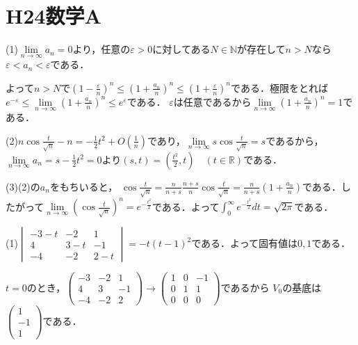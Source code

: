 \documentclass[
		book,
		head_space=20mm,
		foot_space=20mm,
		gutter=10mm,
		line_length=190mm
]{jlreq}
\begin{document}
\section{H24数学A}
(1)$\lim\limits_{n \to \infty} a_n=0$より，任意の$\varepsilon>0$に対してある$N\in \mathbb{N}$が存在して$n>N$なら$\varepsilon<a_n<\varepsilon$である．

よって$n>N$で$(1-\frac{\varepsilon}{n})^n\le (1+\frac{a_n}{n})^n\le (1+\frac{\varepsilon}{n})^n$である．極限をとれば$e^{-\varepsilon}\le \lim\limits_{n \to \infty}(1+\frac{a_n}{n})^n\le e^{\varepsilon}$である．
$\varepsilon$は任意であるから$\lim\limits_{n \to \infty}(1+\frac{a_n}{n})^n=1$である．

(2)$n \cos \frac{t}{\sqrt{n}}-n=-\frac{1}{2}t^2+O(\frac{1}{n})$であり，$\lim\limits_{n \to \infty}s \cos \frac{t}{\sqrt{n}}=s$であるから，
$\lim\limits_{n \to \infty}a_n=s-\frac{1}{2}t^2=0$より$(s,t)=(\frac{t^2}{2},t)\quad(t \in \mathbb{R})$である．

(3)(2)の$a_n$をもちいると，
$\cos \frac{t}{\sqrt{n}}=\frac{n}{n+s}\frac{n+s}{n}\cos \frac{t}{\sqrt{n}}=\frac{n}{n+s}(1+\frac{a_n}{n})$である．したがって$\lim\limits_{n \to \infty}(\cos \frac{t}{\sqrt{n}})^n=e^{-\frac{t^2}{2}}$である．よって$\int_0^\infty e^{-\frac{t^2}{2}}dt=\sqrt{2\pi}$である．

(1)$\begin{vmatrix}
    -3-t & -2 & 1\\
    4 & 3-t & -1\\
    -4 & -2 & 2-t
\end{vmatrix}=-t(t-1)^2$である．よって固有値は$0,1$である．

$t=0$のとき，$\begin{pmatrix}
    -3 & -2 & 1\\
    4 & 3 & -1\\
    -4 & -2 & 2
    \end{pmatrix}\rightarrow \begin{pmatrix}
    1 & 0 & -1\\
    0 & 1 & 1\\
    0 & 0 & 0
    \end{pmatrix}$であるから
    $V_0$の基底は$\begin{pmatrix}
        1\\
        -1\\
        1
    \end{pmatrix}$である．
\end{document}
